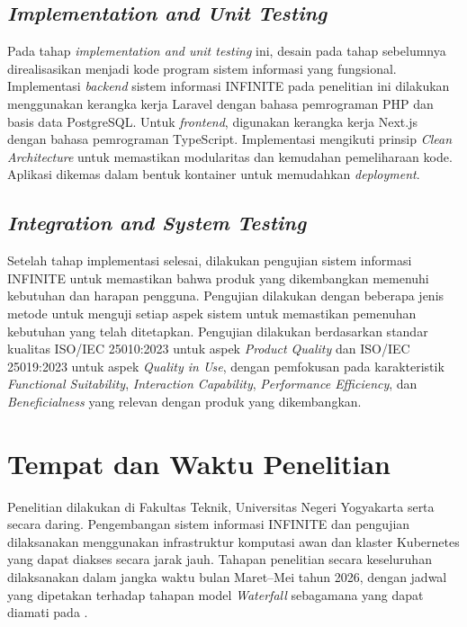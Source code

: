 \subsection{\textit{Implementation and Unit Testing}}

Pada tahap \textit{implementation and unit testing} ini, desain pada tahap sebelumnya direalisasikan menjadi kode program sistem informasi yang fungsional. Implementasi \textit{backend} sistem informasi INFINITE pada penelitian ini dilakukan menggunakan kerangka kerja Laravel dengan bahasa pemrograman PHP dan basis data PostgreSQL. Untuk \textit{frontend}, digunakan kerangka kerja Next.js dengan bahasa pemrograman TypeScript. Implementasi mengikuti prinsip \textit{Clean Architecture} untuk memastikan modularitas dan kemudahan pemeliharaan kode. Aplikasi dikemas dalam bentuk kontainer untuk memudahkan \textit{deployment}.

\subsection{\textit{Integration and System Testing}}

Setelah tahap implementasi selesai, dilakukan pengujian sistem informasi INFINITE untuk memastikan bahwa produk yang dikembangkan memenuhi kebutuhan dan harapan pengguna. Pengujian dilakukan dengan beberapa jenis metode untuk menguji setiap aspek sistem untuk memastikan pemenuhan kebutuhan yang telah ditetapkan. Pengujian dilakukan berdasarkan standar kualitas ISO/IEC 25010:2023 untuk aspek \textit{Product Quality} dan ISO/IEC 25019:2023 untuk aspek \textit{Quality in Use}, dengan pemfokusan pada karakteristik \textit{Functional Suitability}, \textit{Interaction Capability}, \textit{Performance Efficiency}, dan \textit{Beneficialness} yang relevan dengan produk yang dikembangkan.

\section{Tempat dan Waktu Penelitian}

Penelitian dilakukan di Fakultas Teknik, Universitas Negeri Yogyakarta serta secara daring. Pengembangan sistem informasi INFINITE dan pengujian dilaksanakan menggunakan infrastruktur komputasi awan dan klaster Kubernetes yang dapat diakses secara jarak jauh. Tahapan penelitian secara keseluruhan dilaksanakan dalam jangka waktu bulan Maret--Mei tahun 2026, dengan jadwal yang dipetakan terhadap tahapan model \textit{Waterfall} sebagamana yang dapat diamati pada .

